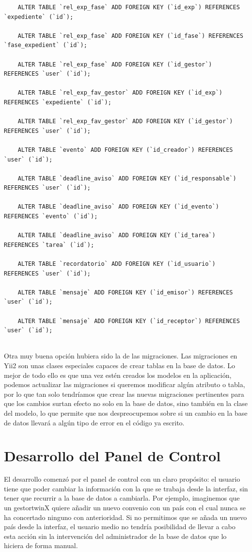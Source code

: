\begin{verbatim}
	ALTER TABLE `rel_exp_fase` ADD FOREIGN KEY (`id_exp`) REFERENCES `expediente` (`id`);
	
	ALTER TABLE `rel_exp_fase` ADD FOREIGN KEY (`id_fase`) REFERENCES `fase_expedient` (`id`);
	
	ALTER TABLE `rel_exp_fase` ADD FOREIGN KEY (`id_gestor`) REFERENCES `user` (`id`);
	
	ALTER TABLE `rel_exp_fav_gestor` ADD FOREIGN KEY (`id_exp`) REFERENCES `expediente` (`id`);
	
	ALTER TABLE `rel_exp_fav_gestor` ADD FOREIGN KEY (`id_gestor`) REFERENCES `user` (`id`);
	
	ALTER TABLE `evento` ADD FOREIGN KEY (`id_creador`) REFERENCES `user` (`id`);
	
	ALTER TABLE `deadline_aviso` ADD FOREIGN KEY (`id_responsable`) REFERENCES `user` (`id`);
	
	ALTER TABLE `deadline_aviso` ADD FOREIGN KEY (`id_evento`) REFERENCES `evento` (`id`);
	
	ALTER TABLE `deadline_aviso` ADD FOREIGN KEY (`id_tarea`) REFERENCES `tarea` (`id`);
	
	ALTER TABLE `recordatorio` ADD FOREIGN KEY (`id_usuario`) REFERENCES `user` (`id`);
	
	ALTER TABLE `mensaje` ADD FOREIGN KEY (`id_emisor`) REFERENCES `user` (`id`);
	
	ALTER TABLE `mensaje` ADD FOREIGN KEY (`id_receptor`) REFERENCES `user` (`id`);
	
\end{verbatim}

Otra muy buena opción hubiera sido la de las migraciones. Las migraciones en Yii2 son unas clases especiales capaces de crear tablas en la base de datos. Lo mejor de todo ello es que una vez estén creados los modelos en la aplicación, podemos actualizar las migraciones si queremos modificar algún atributo o tabla, por lo que tan solo tendríamos que crear las nuevas migraciones pertinentes para que los cambios surtan efecto no solo en la base de datos, sino también en la clase del modelo, lo que permite que nos despreocupemos sobre si un cambio en la base de datos llevará a algún tipo de error en el código ya escrito.

\section{Desarrollo del Panel de Control}

El desarrollo comenzó por el panel de control con un claro propósito: el usuario tiene que poder cambiar la información con la que se trabaja desde la interfaz, sin tener que recurrir a la base de datos a cambiarla. Por ejemplo, imaginemos que un \gls{gestortwinX} quiere añadir un nuevo convenio con un país con el cual nunca se ha concertado ninguno con anterioridad. Si no permitimos que se añada un nuevo país desde la interfaz, el usuario medio no tendría posibilidad de llevar a cabo esta acción sin la intervención del administrador de la base de datos que lo hiciera de forma manual.

